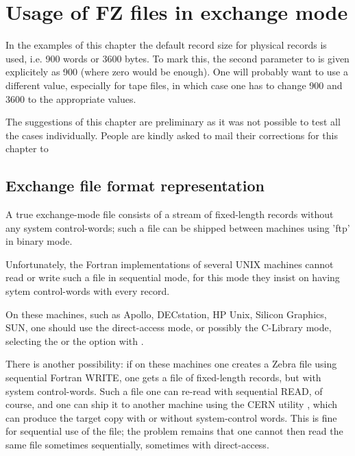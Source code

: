 
\chapter{Usage of FZ files in exchange mode}

In the examples of this chapter the default record size
for physical records is used, i.e. 900 words or 3600 bytes.
To mark this, the second parameter to  is given explicitely
as 900 (where zero would be enough).
One will probably want to use a different value,
especially for tape files,
in which case one has to change 900 and 3600 to the appropriate values.

The suggestions of this chapter are preliminary as it was not
possible to test all the cases individually.
People are kindly asked to mail their corrections for
this chapter to 

\section{Exchange file format representation}

A true exchange-mode file consists of a stream of fixed-length
records without any system control-words;
such a file can be shipped between machines using 'ftp'
in binary mode.

Unfortunately, the Fortran implementations of several UNIX
machines cannot read or write such a file in sequential mode,
for this mode they insist on having sytem control-words
with every record.

On these machines,
such as Apollo, DECstation, HP Unix, Silicon Graphics, SUN,
one should use the direct-access mode, or possibly the C-Library mode,
selecting the  or the  option with .

There is another possibility:
if on these machines one creates a Zebra file using sequential
Fortran WRITE, one gets a file of fixed-length records,
but with system control-words.
Such a file one can re-read with sequential READ, of course,
and one can ship it to another machine using the CERN utility ,
which can produce the target copy with or without system-control words.
This is fine for sequential use of the file;
the problem remains that one cannot then read the same file
sometimes sequentially, sometimes with direct-access.

